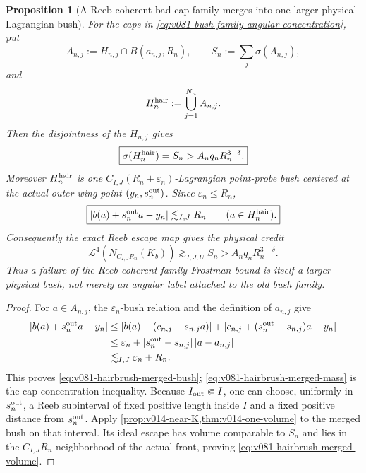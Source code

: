 \documentclass[10pt]{article}
\newtheorem{proposition}[theorem]{Proposition}
\begin{document}
\begin{proposition}[A Reeb-coherent bad cap family merges into one larger physical Lagrangian bush]
\label{prop:v081-hairbrush-merges-to-one-bush}
For the caps in \eqref{eq:v081-bush-family-angular-concentration}, put
\[
A_{n,j}:=H_{n,j}\cap B(a_{n,j},R_n),
\qquad
S_n:=\sum_j\sigma(A_{n,j}),
\]
and
\[
H_n^{\rm hair}
:=
\bigcup_{j=1}^{N_n}A_{n,j}.
\]
Then the disjointness of the \(H_{n,j}\) gives
\begin{equation}
\label{eq:v081-hairbrush-merged-mass}
\boxed{
\sigma(H_n^{\rm hair})=S_n
>
A_nq_nR_n^{3-\delta}.
}
\end{equation}
Moreover \(H_n^{\rm hair}\) is one
\(C_{I,J}(R_n+\varepsilon_n)\)-Lagrangian point-probe bush centered at the actual outer-wing point
\((y_n,s_n^{\rm out})\).  Since \(\varepsilon_n\le R_n\),
\begin{equation}
\label{eq:v081-hairbrush-merged-bush}
\boxed{
|b(a)+s_n^{\rm out}a-y_n|
\lesssim_{I,J}R_n
\qquad(a\in H_n^{\rm hair}).
}
\end{equation}
Consequently the exact Reeb escape map gives the physical credit
\begin{equation}
\label{eq:v081-hairbrush-merged-volume}
\boxed{
\mathcal L^4\!\left(N_{C_{I,J}R_n}(K_b)\right)
\gtrsim_{I,J,U}
S_n
>
A_nq_nR_n^{3-\delta}.
}
\end{equation}
Thus a failure of the Reeb-coherent family Frostman bound is itself a larger physical bush, not
merely an angular label attached to the old bush family.
\end{proposition}

\begin{proof}
For \(a\in A_{n,j}\), the \(\varepsilon_n\)-bush relation and the definition of
\(a_{n,j}\) give
\[
\begin{aligned}
|b(a)+s_n^{\rm out}a-y_n|
&\le
|b(a)-(c_{n,j}-s_{n,j}a)|
+
|c_{n,j}+(s_n^{\rm out}-s_{n,j})a-y_n|\\
&\le
\varepsilon_n
+
|s_n^{\rm out}-s_{n,j}|\,|a-a_{n,j}|\\
&\lesssim_{I,J}
\varepsilon_n+R_n.
\end{aligned}
\]
This proves \eqref{eq:v081-hairbrush-merged-bush};
\eqref{eq:v081-hairbrush-merged-mass} is the cap concentration inequality.  Because
\(I_{\rm out}\Subset I\), one can choose, uniformly in \(s_n^{\rm out}\), a Reeb subinterval of
fixed positive length inside \(I\) and a fixed positive distance from \(s_n^{\rm out}\).  Apply
\cref{prop:v014-near-K,thm:v014-one-volume} to the merged bush on that interval.  Its ideal escape
has volume comparable to \(S_n\) and lies in the \(C_{I,J}R_n\)-neighborhood of the actual front,
proving \eqref{eq:v081-hairbrush-merged-volume}.
\end{proof}
\end{document}
